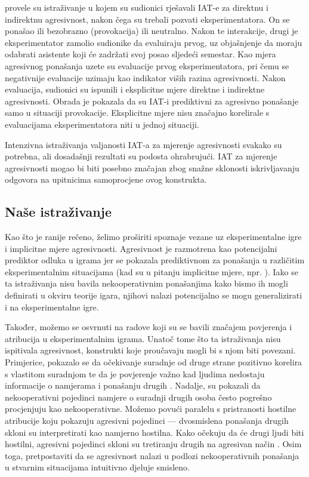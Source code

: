 \documentclass[a4paper, 12pt]{report}
\begin{document}
\citet{richetin2010predictive} provele su istraživanje u kojem su sudionici
rješavali IAT-e za direktnu i indirektnu agresivnost, nakon čega su trebali
pozvati eksperimentatora. On se ponašao ili bezobrazno (provokacija) ili
neutralno. Nakon te interakcije, drugi je eksperimentator zamolio sudionike da
evaluiraju prvog, uz objašnjenje da moraju odabrati asistente koji će zadržati
svoj posao sljedeći semestar. Kao mjera agresivnog ponašanja uzete su evaluacije
prvog eksperimentatora, pri čemu se negativnije evaluacije uzimaju kao indikator
viših razina agresivnosti. Nakon evaluacija, sudionici su ispunili i
eksplicitne mjere direktne i indirektne agresivnosti. Obrada je pokazala da su
IAT-i prediktivni za agresivno ponašanje samo u situaciji provokacije.
Eksplicitne mjere nisu značajno korelirale s evaluacijama eksperimentatora niti
u jednoj situaciji.

Intenzivna istraživanja valjanosti IAT-a za mjerenje agresivnosti svakako su
potrebna, ali dosadašnji rezultati su podosta ohrabrujući. IAT za mjerenje
agresivnosti mogao bi biti posebno značajan zbog snažne sklonosti iskrivljavanju
odgovora na upitnicima samoprocjene ovog konstrukta. 

\subsection{Naše istraživanje}

Kao što je ranije rečeno, želimo proširiti spoznaje vezane uz eksperimentalne
igre i implicitne mjere agresivnosti.
Agresivnost je razmotrena kao potencijalni prediktor odluka u 
igrama  jer se pokazala
prediktivnom za ponašanja u različitim eksperimentalnim situacijama
(kad su u pitanju implicitne mjere, npr. 
\citealp{richetin2010predictive, banse2015predicting}). 
Iako se ta istraživanja nisu bavila nekooperativnim ponašanjima kako bismo ih
mogli definirati u okviru teorije igara, njihovi nalazi potencijalno se mogu
generalizirati i na eksperimentalne igre.

Također,  možemo se osvrnuti na radove koji su se
bavili značajem povjerenja i atribucija u eksperimentalnim igrama.
Unatoč tome što ta istraživanja nisu ispitivala agresivnost, konstrukti koje proučavaju mogli
bi s njom biti povezani.
Primjerice, pokazalo se da očekivanje suradnje od druge strane pozitivno korelira s vlastitom
suradnjom te da je povjerenje važno kad ljudima nedostaju informacije o
namjerama i ponašanju drugih \citep{balliet2013trust, vancoop}. Nadalje,
\citet{kelley1970inference} su pokazali da nekooperativni pojedinci namjere o
suradnji drugih osoba često pogrešno procjenjuju kao nekooperativne.
Možemo povući paralelu s pristranosti hostilne atribucije koju pokazuju agresivni
pojedinci --- dvosmislena ponašanja drugih skloni su interpretirati kao namjerno
hostilna. Kako očekuju da će drugi ljudi biti hostilni, agresivni pojedinci
skloni su tretiranju drugih na agresivan način \citep{larsbuss}. 
Osim toga, pretpostaviti da se agresivnost nalazi u podlozi nekooperativnih
ponašanja u stvarnim situacijama intuitivno djeluje smisleno.
\end{document}
